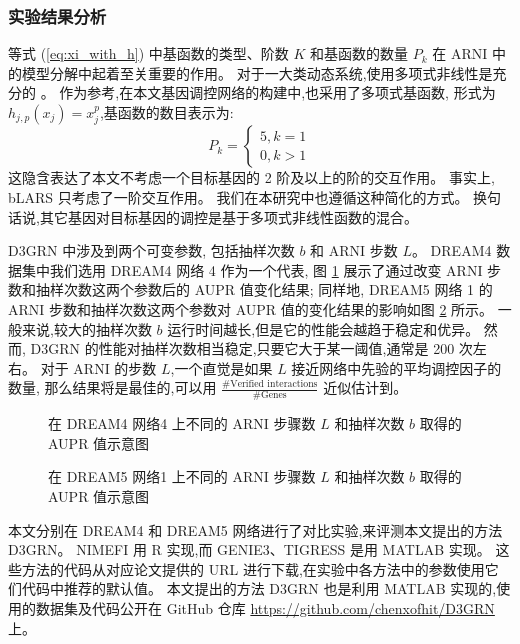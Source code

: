 \subsubsection{实验结果分析}

等式 (\ref{eq:xi_with_h}) 中基函数的类型、阶数 $K$ 和基函数的数量 $P_k$ 在 ARNI 中的模型分解中起着至关重要的作用。
对于一大类动态系统,使用多项式非线性是充分的 。
作为参考,在本文基因调控网络的构建中,也采用了多项式基函数,
形式为 $h_{j,p}(x_j)=x_j^p$,基函数的数目表示为: 
\begin{equation}
P_k=\left\{\begin{matrix}
5,  k=1\\ 
0,  k>1
\end{matrix}\right. 
\end{equation}
这隐含表达了本文不考虑一个目标基因的 2 阶及以上的阶的交互作用。
事实上, bLARS  只考虑了一阶交互作用。
我们在本研究中也遵循这种简化的方式。
换句话说,其它基因对目标基因的调控是基于多项式非线性函数的混合。

D3GRN 中涉及到两个可变参数,
包括抽样次数 $b$ 和 ARNI 步数 $L$。
DREAM4 数据集中我们选用 DREAM4 网络 4 作为一个代表,
图 \ref{fig:performance_dr4_4} 展示了通过改变 ARNI 步数和抽样次数这两个参数后的 AUPR 值变化结果;
同样地, DREAM5 网络 1 的 ARNI 步数和抽样次数这两个参数对 AUPR 值的变化结果的影响如图 \ref{fig:performance_dr5} 所示。
一般来说,较大的抽样次数 $b$ 运行时间越长,但是它的性能会越趋于稳定和优异。
然而, D3GRN 的性能对抽样次数相当稳定,只要它大于某一阈值,通常是 200 次左右。
对于 ARNI 的步数 $L$,一个直觉是如果 $L$ 接近网络中先验的平均调控因子的数量,
那么结果将是最佳的,可以用 $\frac{\#\text{Verified interactions}}{\#\text{Genes}}$ 近似估计到。

\begin{figure}[!htbp]
  \centering
  
  \caption{在 DREAM4 网络4 上不同的 ARNI 步骤数 $L$ 和抽样次数 $b$ 取得的 AUPR 值示意图}
  \label{fig:performance_dr4_4}
\end{figure}

\begin{figure}[!htbp]
  \centering
  
  \caption{在 DREAM5 网络1 上不同的 ARNI 步骤数 $L$ 和抽样次数 $b$ 取得的 AUPR 值示意图}
  \label{fig:performance_dr5}
\end{figure}

本文分别在 DREAM4 和 DREAM5 网络进行了对比实验,来评测本文提出的方法 D3GRN。
NIMEFI 用 R 实现,而 GENIE3、TIGRESS 是用 MATLAB 实现。
这些方法的代码从对应论文提供的 URL 进行下载,在实验中各方法中的参数使用它们代码中推荐的默认值。
本文提出的方法 D3GRN 也是利用 MATLAB 实现的,使用的数据集及代码公开在 GitHub 仓库 \url{https://github.com/chenxofhit/D3GRN} 上。

